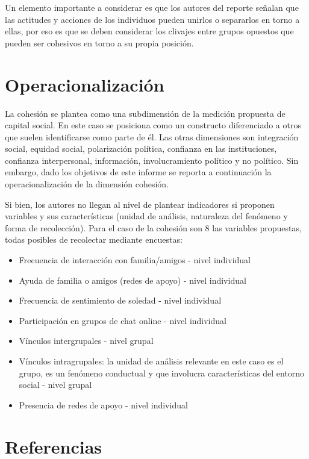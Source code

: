 \documentclass[
  12pt,
]{book}
\begin{document}
Un elemento importante a considerar es que los autores del reporte señalan que las actitudes y acciones de los individuos pueden unirlos o separarlos en torno a ellas, por eso es que se deben considerar los clivajes entre grupos opuestos que pueden ser cohesivos en torno a su propia
posición.

\hypertarget{operacionalizaciuxf3n}{%
\section{Operacionalización}\label{operacionalizaciuxf3n}}

La cohesión se plantea como una subdimensión de la medición propuesta de capital social. En este caso se posiciona como un constructo diferenciado a otros que suelen identificarse como parte de él. Las otras dimensiones son integración social, equidad social, polarización política, confianza en las instituciones, confianza interpersonal, información, involucramiento político y no político. Sin embargo, dado los objetivos de este informe se reporta a continuación la operacionalización de la dimensión cohesión.

Si bien, los autores no llegan al nivel de plantear indicadores si proponen variables y sus características (unidad de análisis, naturaleza del fenómeno y forma de recolección). Para el caso de la cohesión son 8 las variables propuestas, todas posibles de recolectar mediante
encuestas:

\begin{itemize}
\item
  Frecuencia de interacción con familia/amigos - nivel individual
\item
  Ayuda de familia o amigos (redes de apoyo) - nivel individual
\item
  Frecuencia de sentimiento de soledad - nivel individual
\item
  Participación en grupos de chat online - nivel individual
\item
  Vínculos intergrupales - nivel grupal
\item
  Vínculos intragrupales: la unidad de análisis relevante en este caso
  es el grupo, es un fenómeno conductual y que involucra
  características del entorno social - nivel grupal
\item
  Presencia de redes de apoyo - nivel individual
\end{itemize}

\hypertarget{referencias}{%
\section{Referencias}\label{referencias}}
\end{document}
